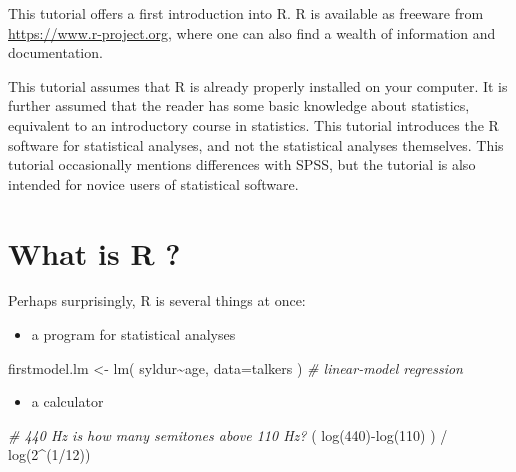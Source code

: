 \documentclass[
]{book}
\newenvironment{Shaded}{\begin{snugshade}}{\end{snugshade}}
\newcommand{\AttributeTok}[1]{\textcolor[rgb]{0.77,0.63,0.00}{#1}}
\newcommand{\CommentTok}[1]{\textcolor[rgb]{0.56,0.35,0.01}{\textit{#1}}}
\newcommand{\DecValTok}[1]{\textcolor[rgb]{0.00,0.00,0.81}{#1}}
\newcommand{\FunctionTok}[1]{\textcolor[rgb]{0.00,0.00,0.00}{#1}}
\newcommand{\NormalTok}[1]{#1}
\newcommand{\OtherTok}[1]{\textcolor[rgb]{0.56,0.35,0.01}{#1}}
\newcommand{\SpecialCharTok}[1]{\textcolor[rgb]{0.00,0.00,0.00}{#1}}
\providecommand{\tightlist}{%
  \setlength{\itemsep}{0pt}\setlength{\parskip}{0pt}}
\begin{document}
This tutorial offers a first introduction into R.
R is available as freeware from
\url{https://www.r-project.org}, where one can also find a wealth of
information and documentation.

This tutorial assumes that R is already properly
installed on your computer. It is further assumed that the reader has
some basic knowledge about statistics, equivalent to an introductory
course in statistics. This tutorial introduces the R
software for statistical analyses, and not the statistical analyses
themselves. This tutorial occasionally mentions differences with SPSS,
but the tutorial is also intended for novice users of statistical
software.

\hypertarget{sec:whatisR}{%
\section{What is R ?}\label{sec:whatisR}}

Perhaps surprisingly, R is several things at once:

\begin{itemize}
\tightlist
\item
  a program for statistical analyses
\end{itemize}

\begin{Shaded}
\begin{Highlighting}[]
\NormalTok{firstmodel.lm }\OtherTok{\textless{}{-}} \FunctionTok{lm}\NormalTok{( syldur}\SpecialCharTok{\textasciitilde{}}\NormalTok{age, }\AttributeTok{data=}\NormalTok{talkers ) }\CommentTok{\# linear{-}model regression}
\end{Highlighting}
\end{Shaded}

\begin{itemize}
\tightlist
\item
  a calculator
\end{itemize}

\begin{Shaded}
\begin{Highlighting}[]
\CommentTok{\# 440 Hz is \textasciigrave{}how many\textasciigrave{} semitones above 110 Hz?}
\NormalTok{( }\FunctionTok{log}\NormalTok{(}\DecValTok{440}\NormalTok{)}\SpecialCharTok{{-}}\FunctionTok{log}\NormalTok{(}\DecValTok{110}\NormalTok{) ) }\SpecialCharTok{/} \FunctionTok{log}\NormalTok{(}\DecValTok{2}\SpecialCharTok{\^{}}\NormalTok{(}\DecValTok{1}\SpecialCharTok{/}\DecValTok{12}\NormalTok{)) }
\end{Highlighting}
\end{Shaded}
\end{document}
